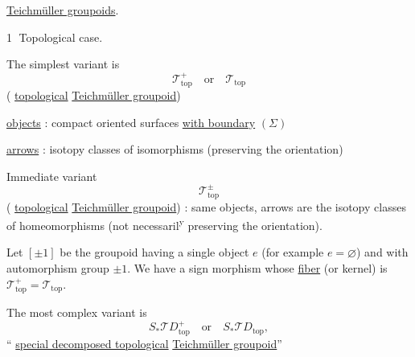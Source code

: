 \uline{Teichmüller groupoids}.

\textcircled{1} Topological case.

The simplest variant is
\[
\mathcal T^+_{\mathrm{top}}\quad\text{or}\quad\mathcal T_{\mathrm{top}}
\]
( \uline{topological} \uline{Teichmüller groupoid})

\uline{objects} : compact oriented surfaces \uline{with boundary} $(\Sigma)$

\uline{arrows} : isotopy classes of isomorphisms (preserving the orientation)


Immediate variant
\[
\mathcal T_{\mathrm{top}}^\pm
\]
( \uline{topological} \uline{Teichmüller groupoid}) :
same objects, arrows are the isotopy classes of homeomorphisms
(not necessaril\textsuperscript{y} preserving the orientation).

Let $[\pm1]$ be the groupoid having a single object $e$ (for example $e=\varnothing$)
and with automorphism group $\pm1$. We have a sign morphism
whose \uline{fiber}  (or kernel) is
$\mathcal T_{\mathrm{top}}^+=\mathcal T_{\mathrm{top}}$.

The most complex variant is
\[
S_*\mathcal TD_{\mathrm{top}}^+\quad\text{or}\quad
S_*\mathcal TD_{\mathrm{top}},
\]
`` \uline{special decomposed topological}
\uline{Teichmüller groupoid}''
